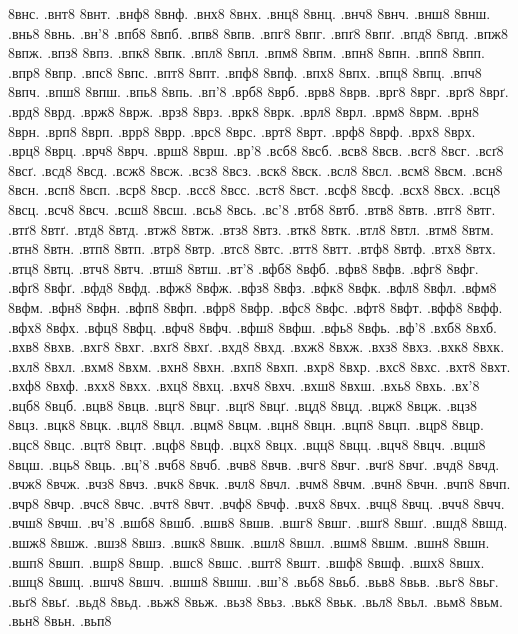 {8внс.
.внт8
8внт.
.внф8
8внф.
.внх8
8внх.
.внц8
8внц.
.внч8
8внч.
.внш8
8внш.
.внь8
8внь.
.вн'8
.впб8
8впб.
.впв8
8впв.
.впг8
8впг.
.впґ8
8впґ.
.впд8
8впд.
.впж8
8впж.
.впз8
8впз.
.впк8
8впк.
.впл8
8впл.
.впм8
8впм.
.впн8
8впн.
.впп8
8впп.
.впр8
8впр.
.впс8
8впс.
.впт8
8впт.
.впф8
8впф.
.впх8
8впх.
.впц8
8впц.
.впч8
8впч.
.впш8
8впш.
.впь8
8впь.
.вп'8
.врб8
8врб.
.врв8
8врв.
.врг8
8врг.
.врґ8
8врґ.
.врд8
8врд.
.врж8
8врж.
.врз8
8врз.
.врк8
8врк.
.врл8
8врл.
.врм8
8врм.
.врн8
8врн.
.врп8
8врп.
.врр8
8врр.
.врс8
8врс.
.врт8
8врт.
.врф8
8врф.
.врх8
8врх.
.врц8
8врц.
.врч8
8врч.
.врш8
8врш.
.вр'8
.всб8
8всб.
.всв8
8всв.
.всг8
8всг.
.всґ8
8всґ.
.всд8
8всд.
.всж8
8всж.
.всз8
8всз.
.вск8
8вск.
.всл8
8всл.
.всм8
8всм.
.всн8
8всн.
.всп8
8всп.
.вср8
8вср.
.всс8
8всс.
.вст8
8вст.
.всф8
8всф.
.всх8
8всх.
.всц8
8всц.
.всч8
8всч.
.всш8
8всш.
.всь8
8всь.
.вс'8
.втб8
8втб.
.втв8
8втв.
.втг8
8втг.
.втґ8
8втґ.
.втд8
8втд.
.втж8
8втж.
.втз8
8втз.
.втк8
8втк.
.втл8
8втл.
.втм8
8втм.
.втн8
8втн.
.втп8
8втп.
.втр8
8втр.
.втс8
8втс.
.втт8
8втт.
.втф8
8втф.
.втх8
8втх.
.втц8
8втц.
.втч8
8втч.
.втш8
8втш.
.вт'8
.вфб8
8вфб.
.вфв8
8вфв.
.вфг8
8вфг.
.вфґ8
8вфґ.
.вфд8
8вфд.
.вфж8
8вфж.
.вфз8
8вфз.
.вфк8
8вфк.
.вфл8
8вфл.
.вфм8
8вфм.
.вфн8
8вфн.
.вфп8
8вфп.
.вфр8
8вфр.
.вфс8
8вфс.
.вфт8
8вфт.
.вфф8
8вфф.
.вфх8
8вфх.
.вфц8
8вфц.
.вфч8
8вфч.
.вфш8
8вфш.
.вфь8
8вфь.
.вф'8
.вхб8
8вхб.
.вхв8
8вхв.
.вхг8
8вхг.
.вхґ8
8вхґ.
.вхд8
8вхд.
.вхж8
8вхж.
.вхз8
8вхз.
.вхк8
8вхк.
.вхл8
8вхл.
.вхм8
8вхм.
.вхн8
8вхн.
.вхп8
8вхп.
.вхр8
8вхр.
.вхс8
8вхс.
.вхт8
8вхт.
.вхф8
8вхф.
.вхх8
8вхх.
.вхц8
8вхц.
.вхч8
8вхч.
.вхш8
8вхш.
.вхь8
8вхь.
.вх'8
.вцб8
8вцб.
.вцв8
8вцв.
.вцг8
8вцг.
.вцґ8
8вцґ.
.вцд8
8вцд.
.вцж8
8вцж.
.вцз8
8вцз.
.вцк8
8вцк.
.вцл8
8вцл.
.вцм8
8вцм.
.вцн8
8вцн.
.вцп8
8вцп.
.вцр8
8вцр.
.вцс8
8вцс.
.вцт8
8вцт.
.вцф8
8вцф.
.вцх8
8вцх.
.вцц8
8вцц.
.вцч8
8вцч.
.вцш8
8вцш.
.вць8
8вць.
.вц'8
.вчб8
8вчб.
.вчв8
8вчв.
.вчг8
8вчг.
.вчґ8
8вчґ.
.вчд8
8вчд.
.вчж8
8вчж.
.вчз8
8вчз.
.вчк8
8вчк.
.вчл8
8вчл.
.вчм8
8вчм.
.вчн8
8вчн.
.вчп8
8вчп.
.вчр8
8вчр.
.вчс8
8вчс.
.вчт8
8вчт.
.вчф8
8вчф.
.вчх8
8вчх.
.вчц8
8вчц.
.вчч8
8вчч.
.вчш8
8вчш.
.вч'8
.вшб8
8вшб.
.вшв8
8вшв.
.вшг8
8вшг.
.вшґ8
8вшґ.
.вшд8
8вшд.
.вшж8
8вшж.
.вшз8
8вшз.
.вшк8
8вшк.
.вшл8
8вшл.
.вшм8
8вшм.
.вшн8
8вшн.
.вшп8
8вшп.
.вшр8
8вшр.
.вшс8
8вшс.
.вшт8
8вшт.
.вшф8
8вшф.
.вшх8
8вшх.
.вшц8
8вшц.
.вшч8
8вшч.
.вшш8
8вшш.
.вш'8
.вьб8
8вьб.
.вьв8
8вьв.
.вьг8
8вьг.
.вьґ8
8вьґ.
.вьд8
8вьд.
.вьж8
8вьж.
.вьз8
8вьз.
.вьк8
8вьк.
.вьл8
8вьл.
.вьм8
8вьм.
.вьн8
8вьн.
.вьп8
}
